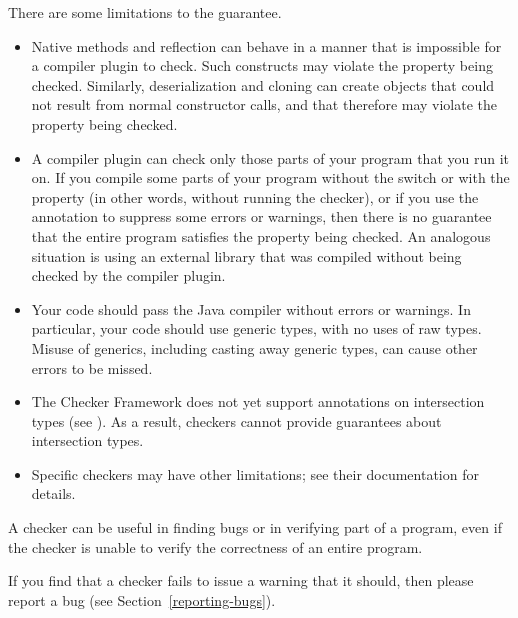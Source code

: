 There are some limitations to the guarantee.

\begin{itemize}

\item
  Native methods and reflection can behave in a manner that is impossible
  for a compiler plugin to check.  Such constructs may violate the
  property being checked.  Similarly, deserialization and cloning can
  create objects that could not result from normal constructor calls, and
  that therefore may violate the property being checked.

\item 
  A compiler plugin can check only those parts of your program that you run
  it on. If you compile some parts of your program without the
   switch or with the  property
  (in other words, without running the checker), or if you use the
   annotation to suppress some errors or warnings,
  then there is no guarantee that the entire program satisfies the property
  being checked.  An analogous situation is using an external library that
  was compiled without being checked by the compiler plugin.

\item 
  Your code should pass the Java compiler without errors or warnings.  In
  particular, your code should use generic types, with no uses of raw types.
  Misuse of generics, including casting away generic types, can cause other
  errors to be missed.

\item
  The Checker Framework does not yet support annotations on intersection
  types (see
  ).  As a result, checkers cannot provide guarantees about
  intersection types.

\item
  Specific checkers may have other limitations; see their documentation for
  details.

\end{itemize}

A checker can be useful in finding bugs or in verifying part of a
program, even if the checker is unable to verify the correctness of an
entire program.

If you find that a checker fails to issue a warning that it
should, then please report a bug (see Section~\ref{reporting-bugs}).


